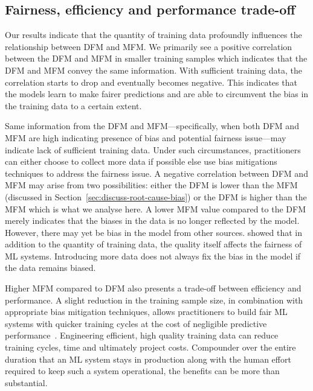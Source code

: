 \documentclass{article}
\begin{document}
\subsection{Fairness, efficiency and performance trade-off}\label{sec:discuss-fair-eff-perf-trade}

Our results indicate that the quantity of training data profoundly
influences the relationship between DFM and MFM. We primarily see a
positive correlation between the DFM and MFM in smaller training
samples which indicates that the DFM and MFM convey the same
information. With sufficient training data, the correlation starts to
drop and eventually becomes negative. This indicates that the models
learn to make fairer predictions and are able to circumvent the bias
in the training data to a certain extent.

Same information from the DFM and MFM---specifically, when both DFM
and MFM are high indicating presence of bias and potential fairness
issue---may indicate lack of sufficient training data. Under such
circumstances, practitioners can either choose to collect more data if
possible else use bias mitigations techniques to address the fairness
issue. A negative correlation between DFM and MFM may arise from two
possibilities: either the DFM is lower than the MFM (discussed in
Section \ref{sec:discuss-root-cause-bias}) or the DFM is higher than
the MFM which is what we analyse here. A lower MFM value compared to
the DFM merely indicates that the biases in the data is no longer
reflected by the model. However, there may yet be bias in the model
from other sources. \citeauthor{zhang2021ignorance} showed that in
addition to the quantity of training data, the quality itself affects
the fairness of ML systems. Introducing more data does not always fix
the bias in the model if the data remains biased.

Higher MFM compared to DFM also presents a trade-off between
efficiency and performance. A slight reduction in the training sample
size, in combination with appropriate bias mitigation techniques,
allows practitioners to build fair ML systems with quicker training
cycles at the cost of negligible predictive performance \cite{CITEME}.
Engineering efficient, high quality training data can reduce training
cycles, time and ultimately project costs. Compounder over the entire
duration that an ML system stays in production along with the human
effort required to keep such a system operational, the benefits can be
more than substantial.
\end{document}
